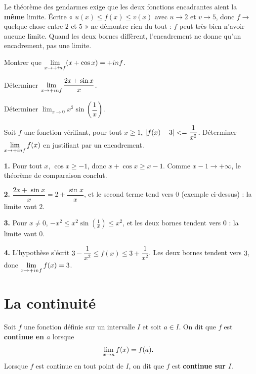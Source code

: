 \begin{erreurclassique}
Le théorème des gendarmes exige que les deux fonctions encadrantes aient la
\textbf{même} limite. Écrire « $u(x) \leq f(x) \leq v(x)$ avec $u \to 2$ et
$v \to 5$, donc $f \to$ quelque chose entre $2$ et $5$ » ne démontre rien du
tout : $f$ peut très bien n'avoir aucune limite. Quand les deux bornes
diffèrent, l'encadrement ne donne qu'un encadrement, pas une limite.
\end{erreurclassique}

\begin{entrainement}
\exo[\niveau{1}] Montrer que $\limpinf (x + \cos x) = +\infty$.

\exo[\niveau{2}] Déterminer $\limpinf \dfrac{2x + \sin x}{x}$.

\exo[\niveau{2}] Déterminer $\displaystyle\lim_{x \to 0} x^{2}\sin\!\left(\dfrac{1}{x}\right)$.

\exo[\niveau{3}] Soit $f$ une fonction vérifiant, pour tout $x \geq 1$,
$\left|f(x) - 3\right| <= \dfrac{1}{x^{2}}$. Déterminer $\limpinf f(x)$ en
justifiant par un encadrement.
\end{entrainement}

\begin{corrige}
\textbf{1.} Pour tout $x$, $\cos x \geq -1$, donc $x + \cos x \geq x - 1$.
Comme $x - 1 \to +\infty$, le théorème de comparaison conclut.

\textbf{2.} $\dfrac{2x+\sin x}{x} = 2 + \dfrac{\sin x}{x}$, et le second terme
tend vers $0$ (exemple ci-dessus) : la limite vaut $2$.

\textbf{3.} Pour $x \neq 0$, $-x^{2} \leq x^{2}\sin\!\left(\tfrac{1}{x}\right) \leq x^{2}$,
et les deux bornes tendent vers $0$ : la limite vaut $0$.

\textbf{4.} L'hypothèse s'écrit $3 - \dfrac{1}{x^{2}} \leq f(x) \leq 3 + \dfrac{1}{x^{2}}$.
Les deux bornes tendent vers $3$, donc $\limpinf f(x) = 3$.
\end{corrige}

\section{La continuité}

\begin{definition}
Soit $f$ une fonction définie sur un intervalle $I$ et soit $a \in I$. On dit
que $f$ est \textbf{continue en $a$} lorsque
\[
  \limx{a} f(x) = f(a).
\]
Lorsque $f$ est continue en tout point de $I$, on dit que $f$ est
\textbf{continue sur $I$}.
\end{definition}

